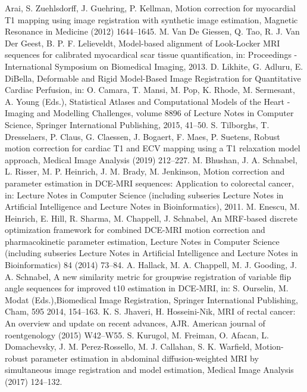 \documentclass[num-refs]{wiley-article}
\begin{document}
\begin{thebibliography}{55}
	Arai, S. Zuehlsdorff, J. Guehring, P. Kellman, Motion correction for myocardial T1 mapping using image registration with synthetic image estimation, Magnetic Resonance in Medicine  (2012) 1644--1645.
	M. Van De Giessen, Q. Tao, R. J. Van Der Geest, B. P. F. Lelieveldt, Model-based alignment of Look-Locker MRI sequences for calibrated myocardical scar tissue quantification, in: Proceedings - International Symposium on
	Biomedical Imaging, 2013.
	D. Likhite, G. Adluru, E. DiBella, Deformable and Rigid Model-Based
	Image Registration for Quantitative Cardiac Perfusion, in: O. Camara,
	T. Mansi, M. Pop, K. Rhode, M. Sermesant, A. Young (Eds.), Statistical
	Atlases and Computational Models of the Heart - Imaging and Modelling Challenges, volume 8896 of Lecture Notes in Computer Science, Springer International Publishing, 2015, 41--50. 
	S. Tilborghs, T. Dresselaers, P. Claus, G. Claessen, J. Bogaert, F. Maes,
	P. Suetens, Robust motion correction for cardiac T1 and ECV mapping using a T1 relaxation model approach, Medical Image Analysis (2019) 212--227.
	M. Bhushan, J. A. Schnabel, L. Risser, M. P. Heinrich, J. M. Brady,
	M. Jenkinson, Motion correction and parameter estimation in DCE-MRI sequences: Application to colorectal cancer, in: Lecture Notes in Computer  Science (including subseries Lecture Notes in Artificial Intelligence and Lecture Notes in Bioinformatics), 2011. 
	M. Enescu, M. Heinrich, E. Hill, R. Sharma, M. Chappell, J. Schnabel, An MRF-based discrete optimization framework for combined DCE-MRI motion correction and pharmacokinetic parameter estimation, Lecture Notes	in Computer Science (including subseries Lecture Notes in Artificial Intelligence and Lecture Notes in Bioinformatics) 84 (2014) 73--84.
	A. Hallack, M. A. Chappell, M. J. Gooding, J. A. Schnabel, A new similarity metric for groupwise registration of variable flip angle sequences for
	improved t10 estimation in DCE-MRI, in: S. Ourselin, M. Modat (Eds.),Biomedical Image Registration, Springer International Publishing, Cham, 595 2014, 154--163.
	K. S. Jhaveri, H. Hosseini-Nik, MRI of rectal cancer: An overview and update on recent advances, AJR. American journal of roentgenology (2015) W42--W55.
	S. Kurugol, M. Freiman, O. Afacan, L. Domachevsky, J. M. Perez-Rossello,
	M. J. Callahan, S. K. Warfield, Motion-robust parameter estimation in
	abdominal diffusion-weighted MRI by simultaneous image registration and model estimation, Medical Image Analysis (2017) 124--132.

\end{thebibliography}
\end{document}
